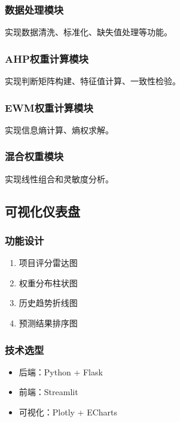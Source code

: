 \subsubsection{数据处理模块}

实现数据清洗、标准化、缺失值处理等功能。

\subsubsection{AHP权重计算模块}

实现判断矩阵构建、特征值计算、一致性检验。

\subsubsection{EWM权重计算模块}

实现信息熵计算、熵权求解。

\subsubsection{混合权重模块}

实现线性组合和灵敏度分析。

\subsection{可视化仪表盘}

\subsubsection{功能设计}

\begin{enumerate}
\item 项目评分雷达图
\item 权重分布柱状图
\item 历史趋势折线图
\item 预测结果排序图
\end{enumerate}

\subsubsection{技术选型}

\begin{itemize}
\item 后端：Python + Flask
\item 前端：Streamlit
\item 可视化：Plotly + ECharts
\end{itemize}


